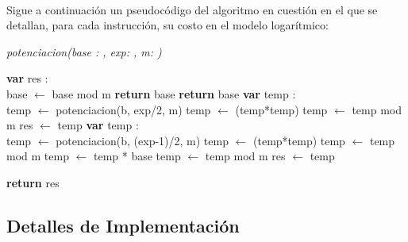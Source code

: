 \paragraph{}
Sigue a continuación un pseudocódigo del algoritmo en cuestión en el que se detallan, para cada instrucción, su costo en el modelo logarítmico: \\

\incmargin{1em}
\linesnumbered
{}

\textsl{potenciacion(base : \nat,  exp: \nat,  m: \nat)}\\
	\begin{algorithm}[H]
		\BlankLine
		\textbf{var} res : \entero \\
		\BlankLine
		base $\leftarrow$ base mod m 
		\BlankLine
		 	{\textbf{return} base}
		{
			{\textbf{return} base}
		{
			{\textbf{var} temp : \entero \\
			temp $\leftarrow$ potenciacion(b, exp/2, m) 
			temp $\leftarrow$ (temp*temp) 
			temp $\leftarrow$ temp mod m 
			res $\leftarrow$ temp }
			{\textbf{var} temp : \entero \\
			temp $\leftarrow$ potenciacion(b, (exp-1)/2, m) 
			temp $\leftarrow$ (temp*temp) 
			temp $\leftarrow$ temp mod m 
			temp $\leftarrow$ temp * base 
			temp $\leftarrow$ temp mod m 
			res $\leftarrow$ temp }
		}}
		\BlankLine
		
		\textbf{return} res
	
	\end{algorithm}


\subsection{Detalles de Implementación}

